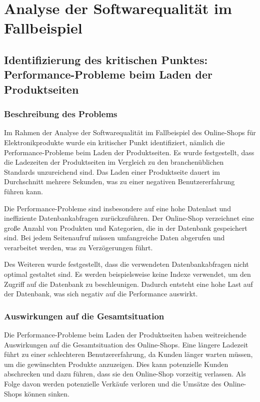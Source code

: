 \section{Analyse der Softwarequalität im Fallbeispiel}

\subsection{Identifizierung des kritischen Punktes: Performance-Probleme beim Laden der Produktseiten}

\subsubsection{Beschreibung des Problems}

Im Rahmen der Analyse der Softwarequalität im Fallbeispiel des Online-Shops für Elektronikprodukte wurde ein kritischer Punkt identifiziert, nämlich die Performance-Probleme beim Laden der Produktseiten. Es wurde festgestellt, dass die Ladezeiten der Produktseiten im Vergleich zu den branchenüblichen Standards unzureichend sind. Das Laden einer Produktseite dauert im Durchschnitt mehrere Sekunden, was zu einer negativen Benutzererfahrung führen kann.

Die Performance-Probleme sind insbesondere auf eine hohe Datenlast und ineffiziente Datenbankabfragen zurückzuführen. Der Online-Shop verzeichnet eine große Anzahl von Produkten und Kategorien, die in der Datenbank gespeichert sind. Bei jedem Seitenaufruf müssen umfangreiche Daten abgerufen und verarbeitet werden, was zu Verzögerungen führt.

Des Weiteren wurde festgestellt, dass die verwendeten Datenbankabfragen nicht optimal gestaltet sind. Es werden beispielsweise keine Indexe verwendet, um den Zugriff auf die Datenbank zu beschleunigen. Dadurch entsteht eine hohe Last auf der Datenbank, was sich negativ auf die Performance auswirkt.

\subsubsection{Auswirkungen auf die Gesamtsituation}
Die Performance-Probleme beim Laden der Produktseiten haben weitreichende Auswirkungen auf die Gesamtsituation des Online-Shops. Eine längere Ladezeit führt zu einer schlechteren Benutzererfahrung, da Kunden länger warten müssen, um die gewünschten Produkte anzuzeigen. Dies kann potenzielle Kunden abschrecken und dazu führen, dass sie den Online-Shop vorzeitig verlassen. Als Folge davon werden potenzielle Verkäufe verloren und die Umsätze des Online-Shops können sinken.

